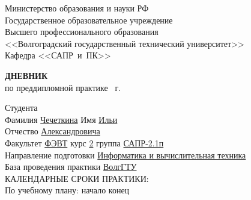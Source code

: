 \documentclass[a4paper, 14pt]{extreport}
\begin{document}
    \begin{titlepage}
        \begin{center}
            Министерство образования и науки РФ \\
            Государственное образовательное учреждение\\
            Высшего профессионального образования\\
            <<Волгоградский государственный технический университет>>\\
            Кафедра <<САПР~и~ПК>>
        \end{center}
        \vspace{2cm}
        \begin{center}
            \large \textbf{ДНЕВНИК} \\
            по преддипломной практике \the\year\ г.
        \end{center}
        \begin{flushleft}
            Студента\\
            Фамилия \underline{Чечеткина\hspace{2.825cm}} 
            Имя \underline{Ильи\hspace{2.7cm}}\\
            Отчество \underline{Александровича\hspace{1.5cm}}\\
            Факультет \underline{ФЭВТ\hspace{3.45cm}} курс \underline{2\hspace{1.5cm}} 
            группа \underline{САПР-2.1п\hspace{2.6cm}}\\
            \vspace{1cm}
            Направление подготовки \underline{Информатика и вычислительная техника\hspace{2.6cm}}\\
            \underline{\hspace{\textwidth}}
            База проведения практики \underline{ВолгГТУ\hspace{9.1cm}}\\
            \underline{\hspace{\textwidth}}\vspace{1cm}
            КАЛЕНДАРНЫЕ СРОКИ ПРАКТИКИ:\\
            По учебному плану: \hspace{0.2cm} начало \underline{\hspace{4.5cm}} 
            конец \underline{\hspace{4.5cm}}\\

\end{flushleft}
\end{titlepage}
\end{document}

